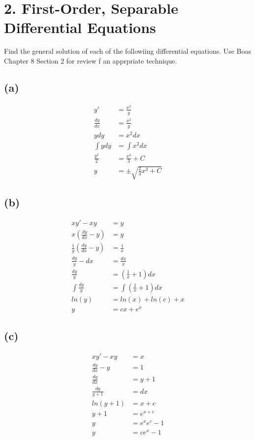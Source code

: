 \documentclass[a4paper,12pt]{article}
\newcommand{\F}[2]{\ensuremath{\frac{#1}{#2}}}
\newcommand{\LP}{\left(}
\newcommand{\RP}{\right)}
\begin{document}
\section*{2. First-Order, Separable Differential Equations}
Find the general solution of each of the followiing differential equations.  Use Boas Chapter 8 Section 2 for review f an apprpriate technique.
\subsection*{(a)}
\begin{align*}
y'&=\F{x^2}{y}\\
\F{dy}{dx}&=\F{x^2}{y}\\
ydy&=x^2dx\\
\int ydy&=\int x^2dx\\
\F{y^2}{2}&=\F{x^3}{3}+C\\
y&=\pm\sqrt{\F{2}{3}x^3+C}
\end{align*}
\subsection*{(b)}
\begin{align*}
xy'-xy&=y\\
x\LP\F{dy}{dx}-y\RP&=y\\
\F{1}{y}\LP\F{dy}{dx}-y\RP&=\F{1}{x}\\
\F{dy}{y}-dx&=\F{dx}{x}\\
\F{dy}{y}&=\LP\F{1}{x}+1\RP dx\\
\int\F{dy}{y}&=\int\LP\F{1}{x}+1\RP dx\\
ln(y)&=ln(x)+ln(c)+x\\
y&=cx+e^x
\end{align*}
\subsection*{(c)}
\begin{align*}
xy'-xy&=x\\
\F{dy}{dx}-y&=1\\
\F{dy}{dx}&=y+1\\
\F{dy}{y+1}&=dx\\
ln(y+1)&=x+c\\
y+1&=e^{x+c}\\
y&=e^xe^c-1\\
y&=ce^x-1
\end{align*}
\end{document}
